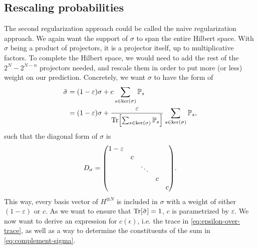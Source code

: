 \subsection{Rescaling probabilities}
The second regularization approach could be called the naive regularization
approach. We again want the support of $\sigma$ to span the entire Hilbert
space. With $\sigma$ being a product of projectors, it is a projector itself,
up to multiplicative factors. To complete the Hilbert space, we would need to
add the rest of the $2^{N}-2^{N-n}$ projectors needed, and rescale them in
order to put more (or less) weight on our prediction. Concretely,
we want $\sigma$ to have the form of
\begin{align}
  \tilde{\sigma} &= (1-\varepsilon)\sigma +  c\sum_{s \in
  \mathrm{ker}(\sigma)} \mathbb{P}_s \label{eq:complement-sigma}\\
&= (1-\varepsilon)\sigma +  \frac{\varepsilon}{\Tr[\sum_{s \in
\mathrm{ker}(\sigma)} \mathbb{P}_s]}\sum_{s \in
\mathrm{ker}(\sigma)} \mathbb{P}_s \label{eq:epsilon-over-trace}
,\end{align}
such that the diagonal form of $\sigma$ is
\begin{align}
  D_\sigma = \mqty(\dmat{1-\varepsilon,c,\ddots,c,c})
.\end{align}
This way, every basis vector of $H^{\otimes N}$ is included in $\sigma$ with a
weight of either $(1-\varepsilon)$ or $c$. As we want to ensure that
$\Tr[\tilde{\sigma}] =1$, $c$ is parametrized by $\varepsilon$. We now want to derive an
expression for $c(\epsilon)$, i.e. the trace in \cref{eq:epsilon-over-trace},
as well as a way to determine the constituents of the sum in
\cref{eq:complement-sigma}.

